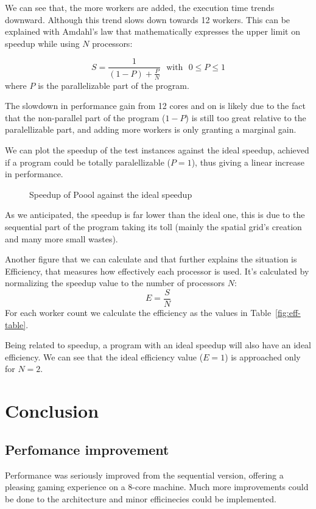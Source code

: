 \documentclass{scrartcl}
\begin{document}
We can see that, the more workers are added, the execution time trends downward. Although this
trend slows down towards 12 workers. This can be explained with Amdahl's law that
mathematically expresses the upper limit on speedup while using $N$ processors:

\[
    S = \frac{1}{(1-P)+\frac{P}{N}} \,\,\text{ with }\,\, 0\le P\le1
\]
where $P$ is the parallelizable part of the program.

The slowdown in performance gain from 12 cores and on is likely due to the fact that the non-parallel
part of the program ($1-P$) is still too great relative to the paralellizable part, and adding 
more workers is only granting a marginal gain.

We can plot the speedup of the test instances against the ideal speedup, achieved if a program could be totally
paralellizable ($P=1$), thus giving a linear increase in performance.

\begin{figure}[H]
    
    \centering
    \caption{Speedup of Poool against the ideal speedup}\label{fig:amdahl-plot}
\end{figure}

As we anticipated, the speedup is far lower than the ideal one, this is due to the sequential part
of the program taking its toll (mainly the spatial grid's creation and many more small wastes).

Another figure that we can calculate and that further explains the situation is Efficiency,
that measures how effectively each processor is used.
It's calculated by normalizing the speedup value to the number of processors $N$:
\[
E = \frac{S}{N}
\]
For each worker count we calculate the efficiency as the values in  Table~\ref{fig:eff-table}.
\begin{table}[H]
    
    \centering
    \caption{Efficiency for each worker count}\label{fig:eff-table}
\end{table}

Being related to speedup, a program with an ideal speedup will also have an ideal efficiency.
We can see that the ideal efficiency value ($E=1$) is approached only for $N=2$.

\section{Conclusion}
\subsection{Perfomance improvement}
Performance was seriously improved from the sequential version, offering a pleasing gaming experience
on a 8-core machine. Much more improvements could be done to the architecture and
minor efficinecies could be implemented.
\end{document}
